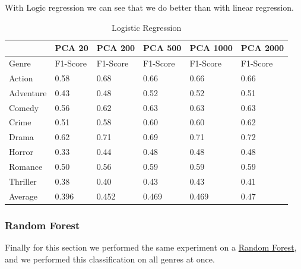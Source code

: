 \documentclass[11pt]{article}
\begin{document}
With Logic regression we can see that we do better than with linear regression. 

\begin{table}[h]
	\label{tab:logr_scores}
\begin{center}
	\begin{tabular}{| l | l | l | l | l | l |}
		\hline		         
                  & PCA 20    & PCA 200           & PCA 500     & PCA 1000  & PCA 2000 \\\hline
        Genre     & F1-Score  & F1-Score          & F1-Score    & F1-Score  & F1-Score\\\hline		
	  	Action    & 0.58      & 0.68			  &  0.66       & 0.66     &  0.66\\
		Adventure & 0.43      & 0.48			  &  0.52       & 0.52     &  0.51\\
		Comedy    & 0.56      & 0.62			  &  0.63       & 0.63     &  0.63\\
		Crime     & 0.51      & 0.58			  &  0.60       & 0.60     &  0.62\\
		Drama     & 0.62      & 0.71			  &  0.69       & 0.71     &  0.72\\
		Horror    & 0.33      & 0.44			  &  0.48       & 0.48     &  0.48\\
		Romance   & 0.50      & 0.56			  &  0.59       & 0.59     &  0.59\\ 
		Thriller  & 0.38      & 0.40			  &  0.43       & 0.43     &  0.41\\\hline
		Average   & 0.396     & 0.452 			  & 0.469       & 0.469    &  0.47\\\hline       
	\end{tabular} 
\end{center}
	\caption{Logistic Regression}
\end{table}


\subsubsection{Random Forest}
Finally for this section we performed the same experiment on a \href{http://scikit-learn.org/stable/modules/generated/sklearn.ensemble.RandomForestClassifier.html}{Random Forest}, and we performed this classification on all genres at once. 
\end{document}
